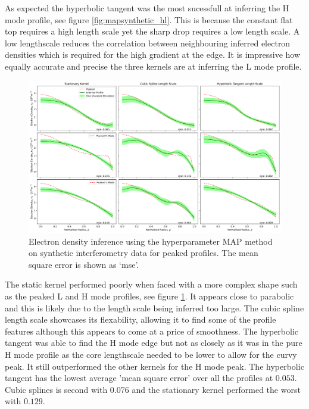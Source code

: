 As expected the hyperbolic tangent was the most sucessfull at inferring the H mode profile, see figure \ref{fig:mapsynthetic_hl}. This is because the constant flat top requires a high length scale yet the sharp drop requires a low length scale. A low lengthscale reduces the correlation between neighbouring inferred electron densities which is required for the high gradient at the edge. It is impressive how equally accurate and precise the three kernels are at inferring the L mode profile.  

\begin{figure}[ht]
    \centering
    \includegraphics[width=500pt, angle=90]{images/Final/MAPsynthetic_final_p.png}
    \caption{Electron density inference using the hyperparameter MAP method on synthetic interferometry data for peaked profiles. The mean square error is shown as `mse'.}
    \label{fig:mapsynthetic_p}
\end{figure}

The static kernel performed poorly when faced with a more complex shape such as the peaked L and H mode profiles, see figure \ref{fig:mapsynthetic_p}. It appears close to parabolic and this is likely due to the length scale being inferred too large. The cubic spline length scale showcases its flexability, allowing it to find some of the profile features although this appears to come at a price of smoothness. The hyperbolic tangent was able to find the H mode edge but not as closely as it was in the pure H mode profile as the core lengthscale needed to be lower to allow for the curvy peak. It still outperformed the other kernels for the H mode peak. The hyperbolic tangent has the lowest average 'mean square error' over all the profiles at $0.053$. Cubic splines is second with $0.076$ and the stationary kernel performed the worst with $0.129$.

